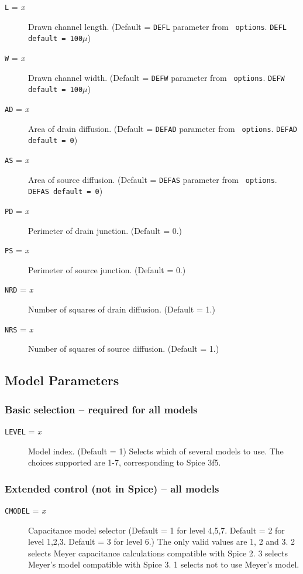 \begin{description}

\item[{\tt L} = {\it x}]
Drawn channel length.  (Default = {\tt DEFL} parameter from {\tt
options}. {\tt DEFL default = 100$\mu$})

\item[{\tt W} = {\it x}]
Drawn channel width.  (Default = {\tt DEFW} parameter from {\tt
options}. {\tt DEFW default = 100$\mu$})

\item[{\tt AD} = {\it x}]
Area of drain diffusion.  (Default = {\tt DEFAD} parameter from {\tt
options}. {\tt DEFAD default = 0})

\item[{\tt AS} = {\it x}]
Area of source diffusion.  (Default = {\tt DEFAS} parameter from {\tt
options}. {\tt DEFAS default = 0})

\item[{\tt PD} = {\it x}]
Perimeter of drain junction.  (Default = 0.)

\item[{\tt PS} = {\it x}]
Perimeter of source junction.  (Default = 0.)

\item[{\tt NRD} = {\it x}]
Number of squares of drain diffusion.  (Default = 1.)

\item[{\tt NRS} = {\it x}]
Number of squares of source diffusion.  (Default = 1.)

\end{description}
\subsection{Model Parameters}

\subsubsection{Basic selection -- required for all models}
\begin{description}

\item[{\tt LEVEL} = {\it x}]
Model index. (Default = 1) Selects which of several models to use.
The choices supported are 1-7, corresponding to Spice 3f5.

\end{description}
\subsubsection{Extended control (not in Spice) -- all models}
\begin{description}

\item[{\tt CMODEL} = {\it x}]
Capacitance model selector (Default = 1 for level 4,5,7.  Default = 2
for level 1,2,3.  Default = 3 for level 6.)  The only valid values are
1, 2 and 3.  2 selects Meyer capacitance calculations compatible with
Spice 2.  3 selects Meyer's model compatible with Spice 3.  1 selects
not to use Meyer's model.

\end{description}
